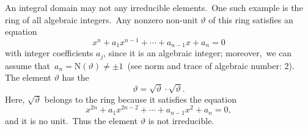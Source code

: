 \documentclass[12pt]{article}
\theoremstyle{definition}
\begin{document}
An integral domain may not  any 
irreducible elements.\, One such example is the ring of all 
algebraic integers.\, Any nonzero non-unit $\vartheta$ of this ring satisfies an equation
    $$x^n\!+\!a_1x^{n-1}\!+\!\cdots\!+\!a_{n-1}x\!+\!a_n = 0$$
with integer coefficients $a_j$, since it is an algebraic 
integer; moreover,\, we can assume that\, 
$a_n = \mbox{N}(\vartheta) \neq \pm 1$\, (see norm and trace of 
algebraic number:  2).\, The element 
$\vartheta$ has the 
$$\vartheta = \sqrt{\vartheta}\!\cdot\!\sqrt{\vartheta}.$$
Here, $\sqrt{\vartheta}$ belongs to the ring because it
satisfies the equation
$$x^{2n}\!+\!a_1x^{2n-2}\!+\!\cdots\!+\!a_{n-1}x^2\!+\!a_n = 0,$$
and it is no unit.\, Thus the element $\vartheta$ is not irreducible.
\end{document}
